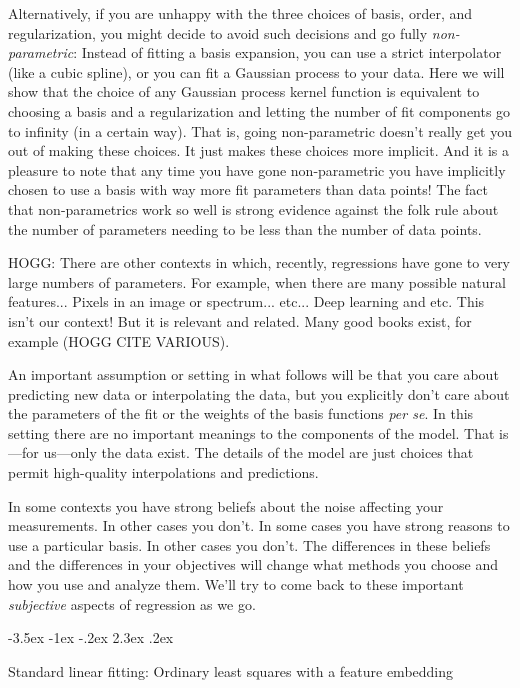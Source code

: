 \documentclass[12pt,letterpaper]{article}
\makeatletter
\renewcommand\section{\@startsection {section}{1}{\z@}%
  {-3.5ex \@plus -1ex \@minus -.2ex}%
  {2.3ex \@plus.2ex}%
  {\raggedright\normalfont\Large\bfseries}}
\newcommand{\foreign}[1]{\textsl{#1}}
\makeatother
\begin{document}
Alternatively, if you are unhappy with the three choices of basis, order, and regularization, you might decide to avoid such decisions and go fully \emph{non-parametric}:
Instead of fitting a basis expansion, you can use a strict interpolator (like a cubic spline), or you can fit a Gaussian process to your data.
Here we will show that the choice of any Gaussian process kernel function is equivalent to choosing a basis and a regularization and letting the number of fit components go to infinity (in a certain way).
That is, going non-parametric doesn't really get you out of making these choices.
It just makes these choices more implicit.
And it is a pleasure to note that any time you have gone non-parametric you have implicitly chosen to use a basis with way more fit parameters than data points!
The fact that non-parametrics work so well is strong evidence against the folk rule about the number of parameters needing to be less than the number of data points.

HOGG: There are other contexts in which, recently, regressions have gone to very large numbers of parameters. For example, when there are many possible natural features... Pixels in an image or spectrum... etc... Deep learning and etc. This isn't our context! But it is relevant and related. Many good books exist, for example (HOGG CITE VARIOUS).

An important assumption or setting in what follows will be that you care about predicting new data or interpolating the data, but you explicitly don't care about the parameters of the fit or the weights of the basis functions \foreign{per se}.
In this setting there are no important meanings to the components of the model.
That is---for us---only the data exist.
The details of the model are just choices that permit high-quality interpolations and predictions.

In some contexts you have strong beliefs about the noise affecting your measurements. In other cases you don't.
In some cases you have strong reasons to use a particular basis.
In other cases you don't.
The differences in these beliefs and the differences in your objectives will change what methods you choose and how you use and analyze them.
We'll try to come back to these important \emph{subjective} aspects of regression as we go.

\section{Standard linear fitting: Ordinary least squares with a feature embedding}
\end{document}
